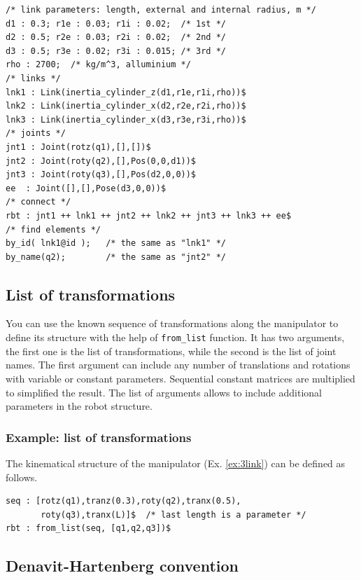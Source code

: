 \documentclass{article}
\begin{document}
\begin{verbatim}
/* link parameters: length, external and internal radius, m */
d1 : 0.3; r1e : 0.03; r1i : 0.02;  /* 1st */
d2 : 0.5; r2e : 0.03; r2i : 0.02;  /* 2nd */
d3 : 0.5; r3e : 0.02; r3i : 0.015; /* 3rd */
rho : 2700;  /* kg/m^3, alluminium */
/* links */
lnk1 : Link(inertia_cylinder_z(d1,r1e,r1i,rho))$
lnk2 : Link(inertia_cylinder_x(d2,r2e,r2i,rho))$
lnk3 : Link(inertia_cylinder_x(d3,r3e,r3i,rho))$
/* joints */
jnt1 : Joint(rotz(q1),[],[])$
jnt2 : Joint(roty(q2),[],Pos(0,0,d1))$
jnt3 : Joint(roty(q3),[],Pos(d2,0,0))$
ee  : Joint([],[],Pose(d3,0,0))$
/* connect */
rbt : jnt1 ++ lnk1 ++ jnt2 ++ lnk2 ++ jnt3 ++ lnk3 ++ ee$
/* find elements */
by_id( lnk1@id );   /* the same as "lnk1" */
by_name(q2);        /* the same as "jnt2" */
\end{verbatim}

\subsection{List of transformations}

You can use the known sequence of transformations along the manipulator to define its structure with the help of \texttt{from\_list} function. It has two arguments, the first one is the list of transformations, while the second is the list of joint names. The first argument can include any number of translations and rotations with variable or constant parameters. Sequential constant matrices are multiplied to simplified the result. The list of arguments allows to include additional parameters in the robot structure. 

\subsubsection{Example: list of transformations} 

The kinematical structure of the manipulator (Ex. \ref{ex:3link}) can be defined as follows. 

\begin{verbatim}
seq : [rotz(q1),tranz(0.3),roty(q2),tranx(0.5),
       roty(q3),tranx(L)]$  /* last length is a parameter */
rbt : from_list(seq, [q1,q2,q3])$
\end{verbatim}

\subsection{Denavit-Hartenberg convention}
\end{document}
